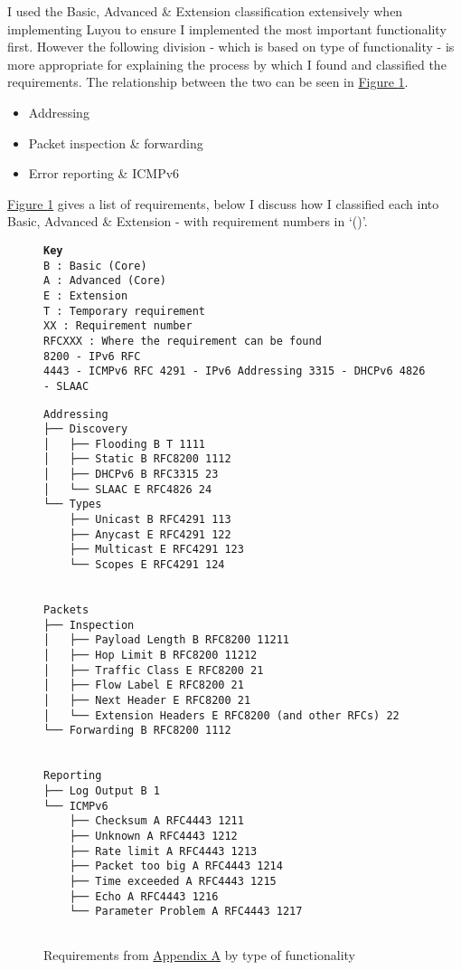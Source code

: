 \documentclass[12pt,a4paper,twoside,openany]{report}
\begin{document}
\bigskip

I used the Basic, Advanced \& Extension classification extensively when implementing Luyou to ensure I implemented the most important functionality first. However the following division - which is based on type of functionality - is more appropriate for explaining the process by which I found and classified the requirements. The relationship between the two can be seen in \hyperref[fig::requirements]{Figure }\ref{fig::requirements}.
\begin{itemize}
\item Addressing
\item Packet inspection \& forwarding
\item Error reporting \& ICMPv6\cite{icmpv6_rfc}
\end{itemize}
\hyperref[fig::requirements]{Figure }\ref{fig::requirements} gives a list of requirements, below I discuss how I classified each into Basic, Advanced \& Extension - with requirement numbers in `()'. 

\begin{figure}
\texttt{\textbf{Key} \\
B : Basic (Core) \\
A : Advanced (Core) \\
E : Extension \\
T : Temporary requirement \\
XX : Requirement number \\
RFCXXX : Where the requirement can be found \\
   8200 - IPv6 RFC\cite{ipv6_rfc} \\
   4443 - ICMPv6 RFC\cite{icmpv6_rfc}
   4291 - IPv6 Addressing\cite{ipv6_rfc_adr}
   3315 - DHCPv6\cite{dhcpv6_rfc}
   4826 - SLAAC\cite{slaac_rfc}
}
\begin{lstlisting}[style=tree]
Addressing
├── Discovery
│   ├── Flooding B T 1111 
│   ├── Static B RFC8200 1112
│   ├── DHCPv6 B RFC3315 23
│   └── SLAAC E RFC4826 24
└── Types
    ├── Unicast B RFC4291 113
    ├── Anycast E RFC4291 122
    ├── Multicast E RFC4291 123
    └── Scopes E RFC4291 124


Packets
├── Inspection
│   ├── Payload Length B RFC8200 11211
│   ├── Hop Limit B RFC8200 11212
│   ├── Traffic Class E RFC8200 21
│   ├── Flow Label E RFC8200 21
│   ├── Next Header E RFC8200 21
│   └── Extension Headers E RFC8200 (and other RFCs) 22
└── Forwarding B RFC8200 1112


Reporting
├── Log Output B 1
└── ICMPv6  
    ├── Checksum A RFC4443 1211
    ├── Unknown A RFC4443 1212
    ├── Rate limit A RFC4443 1213
    ├── Packet too big A RFC4443 1214
    ├── Time exceeded A RFC4443 1215
    ├── Echo A RFC4443 1216
    └── Parameter Problem A RFC4443 1217
 
\end{lstlisting}
\caption{Requirements from \hyperref[appendix::requirements]{Appendix A} by type of functionality}
\label{fig::requirements}
\end{figure}
\end{document}
